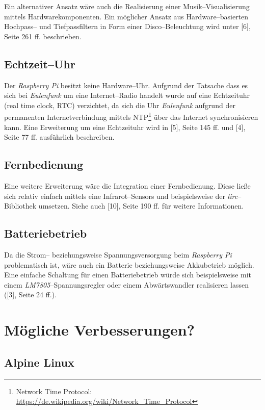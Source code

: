 \documentclass[11pt,ngerman,toc=listof,index=totoc]{scrreprt}
\begin{document}
Ein alternativer Ansatz wäre auch die Realisierung einer
Musik--Visualisierung mittels Hardwarekomponenten. Ein möglicher Ansatz
aus Hardware--basierten Hochpass-- und Tiefpassfiltern in Form einer
Disco--Beleuchtung wird unter {[}6{]}, Seite 261 ff. beschrieben.

\subsection{Echtzeit--Uhr}\label{echtzeituhr}

Der \emph{Raspberry Pi} besitzt keine Hardware--Uhr. Aufgrund der
Tatsache dass es sich bei \emph{Eulenfunk} um eine Internet--Radio
handelt wurde auf eine Echtzeituhr (real time clock, RTC) verzichtet, da
sich die Uhr \emph{Eulenfunk} aufgrund der permanenten
Internetverbindung mittels NTP\footnote{Network Time Protocol:
  \url{https://de.wikipedia.org/wiki/Network_Time_Protocol}} über das
Internet synchronisieren kann. Eine Erweiterung um eine Echtzeituhr wird
in {[}5{]}, Seite 145 ff. und {[}4{]}, Seite 77 ff. ausführlich
beschreiben.

\subsection{Fernbedienung}\label{fernbedienung}

Eine weitere Erweiterung wäre die Integration einer Fernbedienung. Diese
ließe sich relativ einfach mittels eine Infrarot--Sensors und
beispielsweise der \emph{lirc}--Bibliothek umsetzen. Siehe auch
{[}10{]}, Seite 190 ff. für weitere Informationen.

\subsection{Batteriebetrieb}\label{batteriebetrieb}

Da die Strom-- beziehungsweise Spannungsversorgung beim \emph{Raspberry
Pi} problematisch ist, wäre auch ein Batterie beziehungsweise
Akkubetrieb möglich. Eine einfache Schaltung für einen Batteriebetrieb
würde sich beispielsweise mit einem \emph{LM7805}--Spannungsregler oder
einem Abwärtswandler realisieren lassen ({[}3{]}, Seite 24 ff.).

\section{Mögliche Verbesserungen?}\label{muxf6gliche-verbesserungen}

\subsection{Alpine Linux}\label{alpine-linux}
\end{document}

